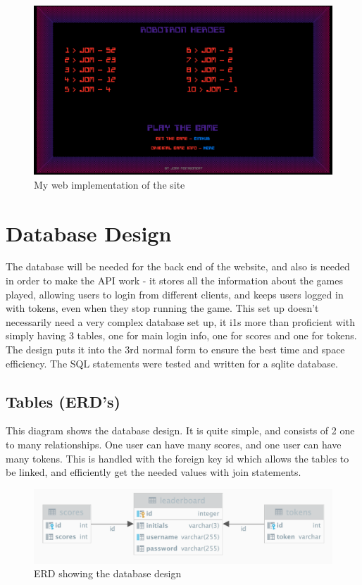 \begin{figure}[H]
  \includegraphics[width=0.8\linewidth]{Figures/web2.png}
  \centering
  \caption{My web implementation of the site}
  \label{fig:web2}
\end{figure}

\section{Database Design}
The database will be needed for the back end of the website, and also is needed in order to make the API work - it stores all the information about the games played, allowing users to login from different clients, and keeps users logged in with tokens, even when they stop running the game. This set up doesn't necessarily need a very complex database set up, it i1s more than proficient with simply having 3 tables, one for main login info, one for scores and one for tokens. The  design puts it into the 3rd normal form to ensure the best time and space efficiency. The SQL statements were tested and written for a sqlite database.

\subsection{Tables (ERD's)}
This diagram shows the database design. It is quite simple, and consists of 2 one to many relationships. One user can have many scores, and one user can have many tokens. This is handled with the foreign key id which allows the tables to be linked, and efficiently get the needed values with join statements.

\begin{figure}[H]
  \includegraphics[width=0.8\linewidth]{Figures/leaderboard.png}
  \centering
  \caption{ERD showing the database design}
  \label{fig:ERD}
\end{figure}

